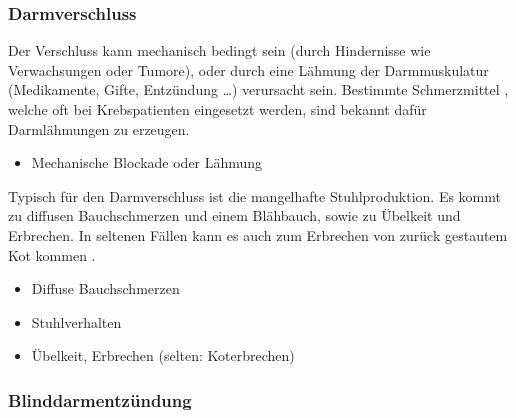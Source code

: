 {\subsubsection{Darmverschluss}
\label{topic:ileus}


{%
Der Verschluss kann mechanisch bedingt sein (durch
Hindernisse wie Verwachsungen oder Tumore), oder durch eine
Lähmung der Darmmuskulatur (Medikamente, Gifte, Entzündung
\ldots) verursacht sein. Bestimmte Schmerzmittel
, welche oft bei Krebspatienten eingesetzt
werden, sind bekannt dafür Darmlähmungen zu erzeugen. 
}{%
\begin{itemize}
  \item Mechanische Blockade oder Lähmung
\end{itemize}
}{}{}{}


{%
Typisch für den Darmverschluss ist die mangelhafte
Stuhlproduktion. Es kommt zu diffusen Bauchschmerzen und einem
Blähbauch, sowie zu Übelkeit und Erbrechen. In seltenen
Fällen kann es auch zum Erbrechen von zurück
gestautem Kot kommen .

\bigskip

}{
\begin{itemize}
  \item Diffuse Bauchschmerzen
  \item Stuhlverhalten
  \item Übelkeit, Erbrechen (selten: Koterbrechen)
\end{itemize}
}{}{}{}


\subsubsection{Blinddarmentzündung}
\label{topic:appendizitis}



}
